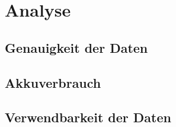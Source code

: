 \clearpage
\section{Analyse}
\subsection{Genauigkeit der Daten}
\subsection{Akkuverbrauch}
\subsection{Verwendbarkeit der Daten}